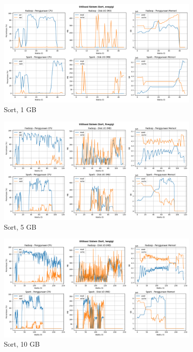 \begin{figure}[h]
    \centering
    \includegraphics[width=0.9\textwidth]{figures/ch04/5-util-sistem-sort-onegig.png}
    \caption*{Sort, 1 GB}
\end{figure}

\begin{figure}[h]
    \centering
    \includegraphics[width=0.9\textwidth]{figures/ch04/5-util-sistem-sort-fivegig.png}
    \caption*{Sort, 5 GB}
\end{figure}

\begin{figure}[h]
    \centering
    \includegraphics[width=0.9\textwidth]{figures/ch04/5-util-sistem-sort-tengig.png}
    \caption*{Sort, 10 GB}
\end{figure}

